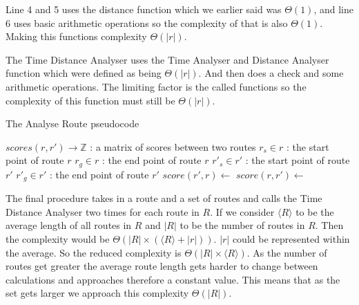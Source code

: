 Line 4 and 5 uses the distance function which we earlier said was $\Theta(1)$, and line 6 uses basic arithmetic operations so the complexity of that is also $\Theta(1)$.
Making this functions complexity $\Theta(|r|)$.

The Time Distance Analyser uses the Time Analyser and Distance Analyser function which were defined as being $\Theta(|r|)$.
And then does a check and some arithmetic operations.
The limiting factor is the called functions so the complexity of this function must still be $\Theta(|r|)$.

\begin{algorithm}
	\caption{The Analyse Route pseudocode}
	\begin{algorithmic}
		\Require
		\Statex $scores(r, r') \rightarrow \mathbb{Z}$ : a matrix of scores between two routes
		\Statex
			\State $r_s\in r$ : the start point of route $r$
			\State $r_g\in r$ : the end point of route $r$
				\State $r'_s\in r'$ : the start point of route $r'$
				\State $r'_g\in r'$ : the end point of route $r'$
				\State $score(r', r)\gets$
				\State $score(r, r')\gets$
			\EndFor
		\EndProcedure
	\end{algorithmic}
\end{algorithm}

The final procedure takes in a route and a set of routes and calls the Time Distance Analyser two times for each route in $R$.
If we consider $\langle R \rangle$ to be the average length of all routes in $R$ and $|R|$ to be the number of routes in $R$.
Then the complexity would be $\Theta(|R|\times(\langle R\rangle + |r|))$.
$|r|$ could be represented within the average.
So the reduced complexity is $\Theta(|R|\times\langle R\rangle)$.
As the number of routes get greater the average route length gets harder to change between calculations and approaches therefore a constant value.
This means that as the set gets larger we approach this complexity $\Theta(|R|)$.


